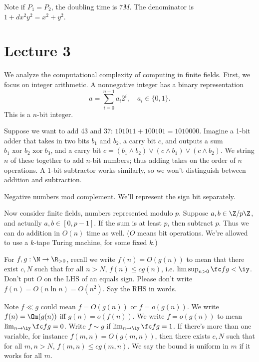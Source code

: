 Note if $P_1=P_2$, the doubling time is $7M$. The denominator is $1+dx^2y^2=x^2+y^2$. %

\section{Lecture 3}
We analyze the computational complexity of computing in finite fields.
First, we focus on integer arithmetic.
A nonnegative integer has a binary representation
\[
a=\sum_{i=0}^{n-1} a_i2^i,\quad a_i\in \{0,1\}.
\]
This is a $n$-bit integer.

Suppose we want to add 43 and 37: $101011+100101=1010000$. Imagine a 1-bit adder that takes in two bits $b_1$ and $b_2$, a carry bit $c$, and outputs a sum $b_1\text{ xor }b_2\text{ xor }b_3$, and a carry bit $c=(b_1\wedge b_2)\vee (c\wedge b_1)\vee (c\wedge b_2)$. We string $n$ of these together to add $n$-bit numbers; thus adding takes on the order of $n$ operations. A 1-bit subtractor works similarly, so we won't distinguish between addition and subtraction.

Negative numbers mod complement. We'll represent the sign bit separately.

Now consider finite fields, numbers represented modulo $p$. Suppose $a,b\in \Z/p\Z$, and actually $a,b\in [0,p-1]$. If the sum is at least $p$, then subtract $p$. Thus we can do addition in $O(n)$ time as well. ($O$ means bit operations. We're allowed to use a $k$-tape Turing machine, for some fixed $k$.)

For $f,g:\N\to \R_{>0}$, recall we write $f(n)=O(g(n))$ to mean that there exist $c,N$ such that for all $n>N$, $f(n)\le cg(n)$, i.e. $\limsup_{n>0}\fc fg<\iy$.
Don't put $O$ on the LHS of an equals sign. Please don't write $f(n)=O(n\ln n)=O(n^2)$. Say the RHS in words.

Note $f\ll g$ could mean $f=O(g(n))$ or $f=o(g(n))$. We write $f(n)=\Om(g(n))$ iff $g(n)=o(f(n))$. We write $f=o(g(n))$ to mean $\lim_{n\to \iy}\fc fg =0$. Write $f\sim g$ if $\lim_{n\to \iy}\fc fg=1$. 
If there's more than one variable, for instance $f(m,n)=O(g(m,n))$, then there exists $c,N$ such that for all $m,n>N$, $f(m,n)\le cg(m,n)$. %
We say the bound is uniform in $m$ if it works for all $m$.

